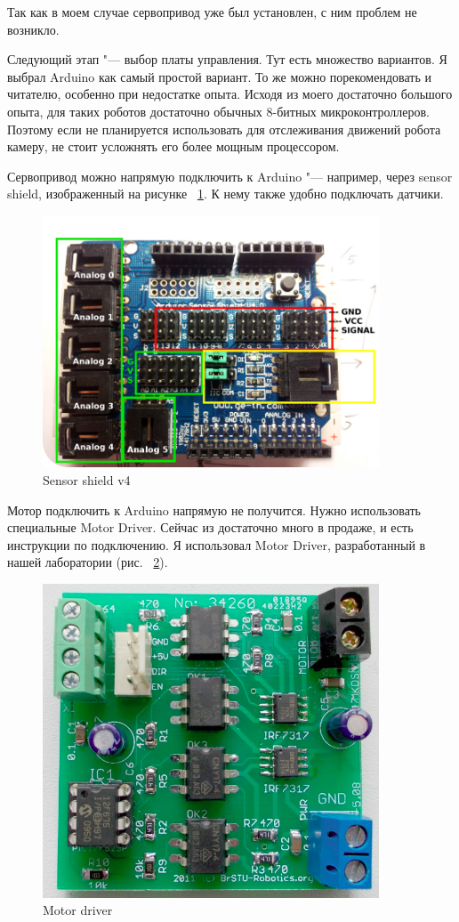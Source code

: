 \documentclass[10pt, a5paper]{article}
\begin{document}
Так как в моем случае сервопривод уже был установлен, с ним проблем не возникло.

Следующий этап "--- выбор платы управления. Тут есть множество вариантов. Я выбрал Arduino как самый простой вариант. То же можно порекомендовать и читателю, особенно при недостатке опыта. Исходя из моего достаточно большого опыта, для таких роботов достаточно обычных 8-битных микроконтроллеров. Поэтому если не планируется использовать для отслеживания движений робота камеру, не стоит усложнять его более мощным процессором.

Сервопривод можно напрямую подключить к Arduino "--- например, через sensor shield, изображенный на рисунке ~\ref{Sklipus3}. К нему также удобно подключать датчики.

\begin{figure}[h!]
  \centering
  \includegraphics[width=10cm]{w_09_2016_Sklipus3.png}
  \caption {Sensor shield v4}\label{Sklipus3}
\end{figure}


Мотор подключить к Arduino напрямую не получится. Нужно использовать специальные Motor Driver. Сейчас из достаточно много в продаже, и есть инструкции по подключению. Я использовал Motor Driver, разработанный в нашей лаборатории (рис. ~\ref{Sklipus4}).

\begin{figure}[h!]
  \centering
  \includegraphics[width=10cm]{w_09_2016_Sklipus4.png}
  \caption {Motor driver}\label{Sklipus4}
\end{figure}
\end{document}
